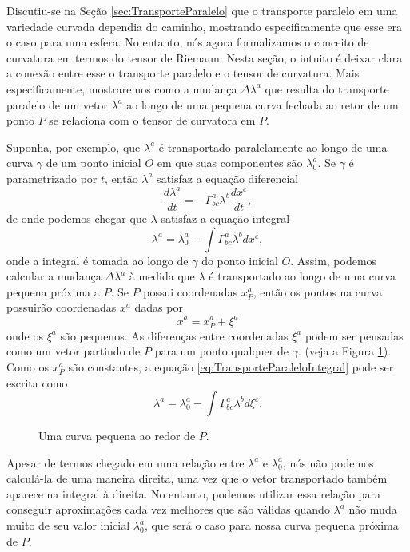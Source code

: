 Discutiu-se na Seção \ref{sec:TransporteParalelo} que o transporte paralelo em uma variedade curvada dependia do caminho, mostrando especificamente que esse era o caso para uma esfera. No entanto, nós agora formalizamos o conceito de curvatura em termos do tensor de Riemann. Nesta seção, o intuito é deixar clara a conexão entre esse o transporte paralelo e o tensor de curvatura. Mais especificamente, mostraremos como a mudança $\Delta\lambda^a$ que resulta do transporte paralelo de um vetor $\lambda^a$ ao longo de uma pequena curva fechada ao retor de um ponto $P$ se relaciona com o tensor de curvatora em $P$.

Suponha, por exemplo, que $\lambda^a$ é transportado paralelamente ao longo de uma curva $\gamma$ de um ponto inicial $O$ em que suas componentes são $\lambda_0^a$. Se $\gamma$ é parametrizado por $t$, então $\lambda^a$ satisfaz a equação diferencial
\begin{equation}\label{eq:TransporteParaleloDiferencial}
	\frac{d\lambda^a}{dt} = -\Gamma^a_{bc}\lambda^b\frac{dx^c}{dt},
\end{equation}
de onde podemos chegar que $\lambda$ satisfaz a equação integral
\begin{equation}\label{eq:TransporteParaleloIntegral}
	\lambda^a = \lambda^a_0 - \int\Gamma^a_{bc}\lambda^b dx^c,
\end{equation}
onde a integral é tomada ao longo de $\gamma$ do ponto inicial $O$. Assim, podemos calcular a mudança $\Delta\lambda^a$ à medida que $\lambda$ é transportado ao longo de uma curva pequena próxima a $P$. Se $P$ possui coordenadas $x^a_P$, então os pontos na curva possuirão coordenadas $x^a$ dadas por
\[
	x^a=x^a_P+\xi^a
\]
onde os $\xi^a$ são pequenos. As diferenças entre coordenadas $\xi^a$ podem ser pensadas como um vetor partindo de $P$ para um ponto qualquer de $\gamma$. (veja a Figura \ref{fig:SmallLoop}). Como os $x^a_P$ são constantes, a equação \eqref{eq:TransporteParaleloIntegral} pode ser escrita como
\begin{equation}\label{eq:TransporteParaleloIntegralXi}
	\lambda^a=\lambda^a_0 - \int\Gamma^a_{bc}\lambda^b d\xi^c .
\end{equation}

\begin{figure}[t]
	\centering
	\caption{Uma curva pequena ao redor de $P$.}
	\label{fig:SmallLoop}
\end{figure}

Apesar de termos chegado em uma relação entre $\lambda^a$ e $\lambda^a_0$, nós não podemos calculá-la de uma maneira direita, uma vez que o vetor transportado também aparece na integral à direita. No entanto, podemos utilizar essa relação para conseguir aproximações cada vez melhores que são válidas quando $\lambda^a$ não muda muito de seu valor inicial $\lambda^a_0$, que será o caso para nossa curva pequena próxima de $P$.

